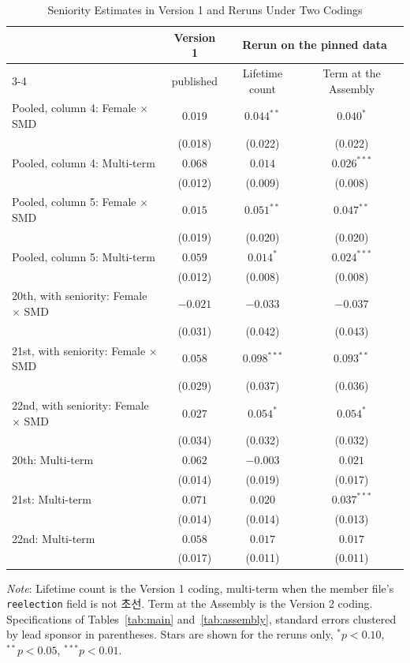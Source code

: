 \documentclass[11pt]{article}
\begin{document}
\begin{table}[htbp]
\centering
\caption{Seniority Estimates in Version 1 and Reruns Under Two Codings}
\label{tab:coding}
\small
\begin{tabular}{p{}ccc}
\toprule
& Version 1 & \multicolumn{2}{c}{Rerun on the pinned data} \\
\cmidrule(lr){3-4}
& published & Lifetime count & Term at the Assembly \\
\midrule
Pooled, column 4: Female $\times$ SMD & $0.019$ & $0.044^{**}$ & $0.040^{*}$ \\
 & (0.018) & (0.022) & (0.022) \\[2pt]
Pooled, column 4: Multi-term & $0.068$ & $0.014$ & $0.026^{***}$ \\
 & (0.012) & (0.009) & (0.008) \\[2pt]
Pooled, column 5: Female $\times$ SMD & $0.015$ & $0.051^{**}$ & $0.047^{**}$ \\
 & (0.019) & (0.020) & (0.020) \\[2pt]
Pooled, column 5: Multi-term & $0.059$ & $0.014^{*}$ & $0.024^{***}$ \\
 & (0.012) & (0.008) & (0.008) \\[2pt]
20th, with seniority: Female $\times$ SMD & $-0.021$ & $-0.033$ & $-0.037$ \\
 & (0.031) & (0.042) & (0.043) \\[2pt]
21st, with seniority: Female $\times$ SMD & $0.058$ & $0.098^{***}$ & $0.093^{**}$ \\
 & (0.029) & (0.037) & (0.036) \\[2pt]
22nd, with seniority: Female $\times$ SMD & $0.027$ & $0.054^{*}$ & $0.054^{*}$ \\
 & (0.034) & (0.032) & (0.032) \\[2pt]
20th: Multi-term & $0.062$ & $-0.003$ & $0.021$ \\
 & (0.014) & (0.019) & (0.017) \\[2pt]
21st: Multi-term & $0.071$ & $0.020$ & $0.037^{***}$ \\
 & (0.014) & (0.014) & (0.013) \\[2pt]
22nd: Multi-term & $0.058$ & $0.017$ & $0.017$ \\
 & (0.017) & (0.011) & (0.011) \\[2pt]
\bottomrule
\end{tabular}

\vspace{4pt}
\parbox{0.92\textwidth}{\footnotesize \textit{Note}: Lifetime count is the Version 1 coding, multi-term when the member file's \texttt{reelection} field is not 초선. Term at the Assembly is the Version 2 coding. Specifications of Tables~\ref{tab:main} and~\ref{tab:assembly}, standard errors clustered by lead sponsor in parentheses. Stars are shown for the reruns only, $^*p<0.10$, $^{**}p<0.05$, $^{***}p<0.01$.}
\end{table}
\end{document}
